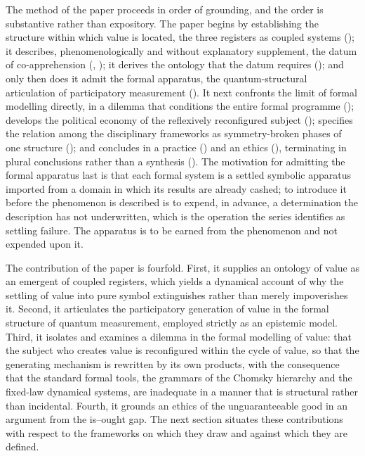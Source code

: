 The method of the paper proceeds in order of grounding, and the order is substantive rather than expository. The paper begins by establishing the structure within which value is located, the three registers as coupled systems (); it describes, phenomenologically and without explanatory supplement, the datum of co-apprehension (, ); it derives the ontology that the datum requires (); and only then does it admit the formal apparatus, the quantum-structural articulation of participatory measurement (). It next confronts the limit of formal modelling directly, in a dilemma that conditions the entire formal programme (); develops the political economy of the reflexively reconfigured subject (); specifies the relation among the disciplinary frameworks as symmetry-broken phases of one structure (); and concludes in a practice () and an ethics (), terminating in plural conclusions rather than a synthesis (). The motivation for admitting the formal apparatus last is that each formal system is a settled symbolic apparatus imported from a domain in which its results are already cashed; to introduce it before the phenomenon is described is to expend, in advance, a determination the description has not underwritten, which is the operation the series identifies as settling failure. The apparatus is to be earned from the phenomenon and not expended upon it.

The contribution of the paper is fourfold. First, it supplies an ontology of value as an emergent of coupled registers, which yields a dynamical account of why the settling of value into pure symbol extinguishes rather than merely impoverishes it. Second, it articulates the participatory generation of value in the formal structure of quantum measurement, employed strictly as an epistemic model. Third, it isolates and examines a dilemma in the formal modelling of value: that the subject who creates value is reconfigured within the cycle of value, so that the generating mechanism is rewritten by its own products, with the consequence that the standard formal tools, the grammars of the Chomsky hierarchy and the fixed-law dynamical systems, are inadequate in a manner that is structural rather than incidental. Fourth, it grounds an ethics of the unguaranteeable good in an argument from the is--ought gap. The next section situates these contributions with respect to the frameworks on which they draw and against which they are defined.
